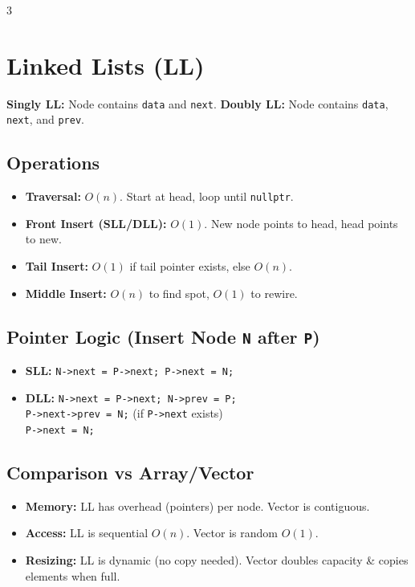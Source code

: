 \documentclass[10pt, landscape, a4paper]{article}
\begin{document}
\begin{multicols*}{3}
  \section{Linked Lists (LL)}
  \textbf{Singly LL:} Node contains \texttt{data} and \texttt{next}.
  \textbf{Doubly LL:} Node contains \texttt{data}, \texttt{next}, and
  \texttt{prev}.

  \subsection{Operations}
  \begin{itemize}
    \item \textbf{Traversal:} $O(n)$. Start at head, loop until
      \texttt{nullptr}.
    \item \textbf{Front Insert (SLL/DLL):} $O(1)$. New node points to
      head, head points to new.
    \item \textbf{Tail Insert:} $O(1)$ if tail pointer exists, else $O(n)$.
    \item \textbf{Middle Insert:} $O(n)$ to find spot, $O(1)$ to rewire.
  \end{itemize}

  \subsection{Pointer Logic (Insert Node \texttt{N} after \texttt{P})}
  \begin{itemize}
    \item \textbf{SLL:} \texttt{N->next = P->next; P->next = N;}
    \item \textbf{DLL:} \texttt{N->next = P->next; N->prev = P;} \\
      \texttt{P->next->prev = N;} (if \texttt{P->next} exists) \\
      \texttt{P->next = N;}
  \end{itemize}

  \subsection{Comparison vs Array/Vector}
  \begin{itemize}
    \item \textbf{Memory:} LL has overhead (pointers) per node.
      Vector is contiguous.
    \item \textbf{Access:} LL is sequential $O(n)$. Vector is random $O(1)$.
    \item \textbf{Resizing:} LL is dynamic (no copy needed). Vector
      doubles capacity \& copies elements when full.
  \end{itemize}


\end{multicols*}
\end{document}
